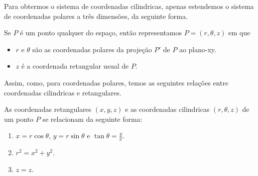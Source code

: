 Para obtermos o sistema de coordenadas cilindricas, apenas estendemos o sistema de coordenadas polares a três dimensões, da seguinte forma.

Se \(P\) é um ponto qualquer do espaço, então representamos \(P = (r,\theta,z)\) em que
    \begin{itemize}
        \item \(r\) e \(\theta\) são as coordenadas polares da projeção \(P'\) de \(P\) ao plano-xy.
        \item \(z\) é a coordenada retangular usual de \(P\).
    \end{itemize}

Assim, como, para coordenadas polares, temos as seguintes relações entre coordenadas cilindricas e retangulares.

\begin{theorem}
    As coordenadas retangulares \((x,y,z)\) e as coordenadas cilindricas \((r,\theta,z)\) de um ponto \(P\) se relacionam da seguinte forma:
        \begin{enumerate}
            \item \(x = r \cos\theta\), \(y = r\sin\theta\) e \(\tan\theta = \frac{y}{x}\).
            \item \(r^2 = x^2 + y^2\).
            \item \(z = z\).
        \end{enumerate}
\end{theorem}

